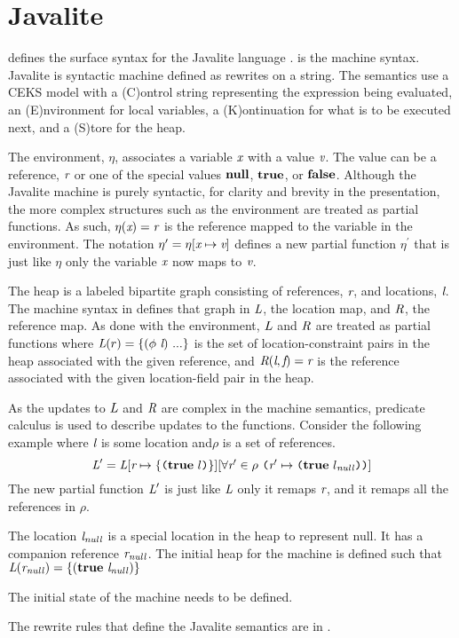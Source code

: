 \section{Javalite}
 defines the surface syntax for the
Javalite language \cite{saints-MS}.  is the
machine syntax. Javalite is syntactic machine defined as rewrites on a
string. The semantics use a CEKS model with a (C)ontrol string
representing the expression being evaluated, an (E)nvironment for
local variables, a (K)ontinuation for what is to be executed next, and
a (S)tore for the heap.




The environment, $\eta$, associates a variable $\emph{x}$ with a
value $\emph{v}$. The value can be a reference, $\emph{r}$ or one of
the special values $\textbf{null}$, $\textbf{true}$, or
$\textbf{false}$. Although the Javalite machine is purely syntactic, for
clarity and brevity in the presentation, the more complex structures
such as the environment are treated as partial functions. As such,
$\eta(\emph{x}) = \emph{r}$ is the reference mapped to the variable
in the environment. The notation $\eta^\prime = \eta[\emph{x} \mapsto
  \emph{v}]$ defines a new partial function $\eta^\prime$ that is
just like $\eta$ only the variable $\emph{x}$ now maps to
$\emph{v}$.

The heap is a labeled bipartite graph consisting of references,
$\emph{r}$, and locations, $\emph{l}$. The machine syntax in
 defines that graph in $\emph{L}$, the
location map, and $\emph{R}$, the reference map. As done with the
environment, $\emph{L}$ and $\emph{R}$ are treated as partial
functions where $\cfgnt{L}(r) = \{(\phi\ \cfgnt{l})\ ...\}$ is the set
of location-constraint pairs in the heap associated with the given
reference, and $\emph{R}(\emph{l},\emph{f}) = \emph{r}$ is the
reference associated with the given location-field pair in the
heap. 

As the updates to $\emph{L}$ and $\emph{R}$ are complex in the
machine semantics, predicate calculus is used to describe updates to
the functions. Consider the following example where $\emph{l}$ is
some location and$\rho$ is a set of references.
\[
\cfgnt{L}^\prime = \cfgnt{L}[\cfgnt{r} \mapsto \{\lp \cfgt{true}\ l\rp \}][\forall \cfgnt{r}^\prime \in \rho\ \lp \cfgnt{r}^\prime \mapsto \lp \cfgt{true}\ l_\mathit{null}\rp \rp ]
\]
The new partial function $\emph{L}^\prime$ is just like $\emph{L}$ only it
remaps $\emph{r}$, and it remaps all the references in $\rho$. 

The location $\emph{l}_\mathit{null}$ is a special location in the heap
to represent null. It has a companion reference
$\emph{r}_\mathit{null}$. The initial heap for the machine is defined
such that $\emph{L}(\emph{r}_\mathit{null}) = \{(\textbf{true}\ \emph{l}_\mathit{null})\}$

The initial state of the machine needs to be defined.



The rewrite rules that define the Javalite semantics are in
.

